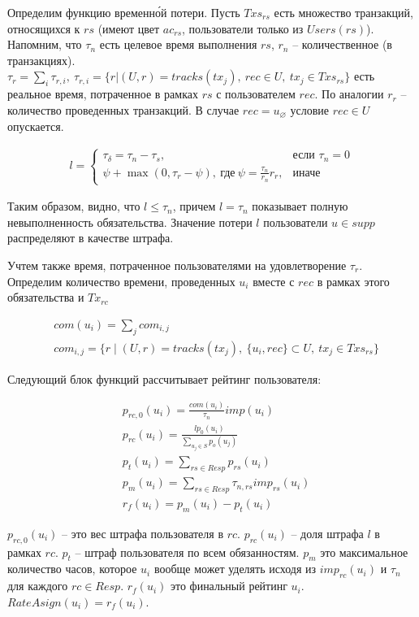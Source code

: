 \documentclass[specification,annotation]{itmo-student-thesis}
\begin{document}
Определим функцию временн\'{о}й потери. Пусть $Txs_{rs}$ есть
множество транзакций, относящихся к $rs$ (имеют цвет $ac_{rs}$,
пользователи только из $Users(rs)$). Напомним, что $\tau_n$ есть
целевое время выполнения $rs$, $r_n$ -- количественное (в
транзакциях). $\tau_r = \sum_i{\tau_{r,i}},\ \tau_{r,i} = \{r | (U,r)
= tracks(tx_j),\ rec \in U, \ tx_j \in Txs_{rs}\}$ есть реальное время,
  потраченное в рамках $rs$ с пользователем $rec$. По аналогии $r_r$
  -- количество проведенных транзакций. В случае $rec =
  u_{\varnothing}$ условие $rec \in U$ опускается.

\begin{align*}
l =
\begin{cases}
  \tau_{\delta} = \tau_n - \tau_s, & \text{если } \tau_n = 0 \\
  \psi + \max{(0, \tau_r - \psi)}, \ \text{где} \ \psi = \frac{\tau_n}{r_n}r_r, & \text{иначе}
\end{cases}
\end{align*}

Таким образом, видно, что $l \leq \tau_n$, причем $l = \tau_n$
показывает полную невыполненность обязательства. Значение потери $l$
пользователи $u \in supp$ распределяют в качестве штрафа.

Учтем также время, потраченное пользователями на удовлетворение
$\tau_r$. Определим количество времени, проведенных $u_i$ вместе с
$rec$ в рамках этого обязательства и $Tx_{rc}$

\begin{align*}
  &com(u_i) = \sum_j{com_{i,j}} \\
  &com_{i,j} = \{r \mid (U,r) = tracks(tx_j),\ \{u_i, rec\} \subset U, \ tx_j \in Txs_{rs}\}
\end{align*}

Следующий блок функций рассчитывает рейтинг пользователя:

\begin{align*}
  &p_{rc,0}(u_i) = \frac{com(u_i)}{\tau_n}imp(u_i) \\
  &p_{rc}(u_i) = \frac{l p_0(u_i)}{\sum_{u_j \in S}{p_o(u_j)}} \\
  &p_t(u_i) = \sum_{rs \in Resp}{p_{rs}(u_i)} \\
  &p_m(u_i) = \sum_{rs \in Resp}{\tau_{n,rs} imp_{rs}(u_i)} \\
  &r_f(u_i) = p_m(u_i) - p_t(u_i)
\end{align*}

$p_{rc,0}(u_i)$ -- это вес штрафа пользователя в $rc$. $p_{rc}(u_i)$
-- доля штрафа $l$ в рамках $rc$. $p_t$ -- штраф пользователя по всем
обязанностям. $p_m$ это максимальное количество часов, которое $u_i$
вообще может уделять исходя из $imp_{rc}(u_i)$ и $\tau_n$ для каждого
$rc \in Resp$. $r_f(u_i)$ это финальный рейтинг $u_i$. $RateAsign(u_i)
= r_f(u_i)$.
\end{document}
